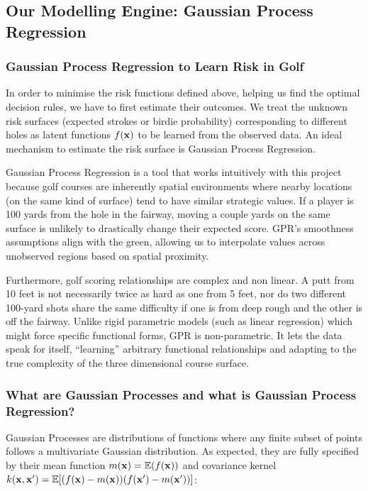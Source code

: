 \documentclass[11pt, letterpaper]{article}
\begin{document}
\subsection{Our Modelling Engine: Gaussian Process Regression}

\subsubsection{Gaussian Process Regression to Learn Risk in Golf}
In order to minimise the risk functions defined above, helping us find the optimal decision rules, we have to first estimate their outcomes. We treat the unknown risk surfaces (expected strokes or birdie probability) corresponding to different holes as latent functions $f(\mathbf{x})$ to be learned from the observed data. An ideal mechanism to estimate the risk surface is Gaussian Process Regression.

Gaussian Process Regression is a tool that works intuitively with this project because golf courses are inherently spatial environments where nearby locations (on the same kind of surface) tend to have similar strategic values. If a player is 100 yards from the hole in the fairway, moving a couple yards on the same surface is unlikely to drastically change their expected score. GPR's smoothness assumptions align with the green, allowing us to interpolate values across unobserved regions based on spatial proximity.

Furthermore, golf scoring relationships are complex and non linear. A putt from 10 feet is not necessarily twice as hard as one from 5 feet, nor do two different 100-yard shots share the same difficulty if one is from deep rough and the other is off the fairway. Unlike rigid parametric models (such as linear regression) which might force specific functional forms, GPR is non-parametric. It lets the data speak for itself, ``learning'' arbitrary functional relationships and adapting to the true complexity of the three dimensional course surface.

\subsubsection{What are Gaussian Processes and what is Gaussian Process Regression?}

Gaussian Processes are distributions of functions where any finite subset of points follows a multivariate Gaussian distribution. As expected, they are fully specified by their mean function $m(\mathbf{x}) = \mathbb{E}(f(\mathbf{x}))$  and covariance kernel $k(\mathbf{x},\mathbf{x}') = \mathbb{E}[(f(\mathbf{x})-m(\mathbf{x}))(f(\mathbf{x}')-m(\mathbf{x}'))]$:
\end{document}

